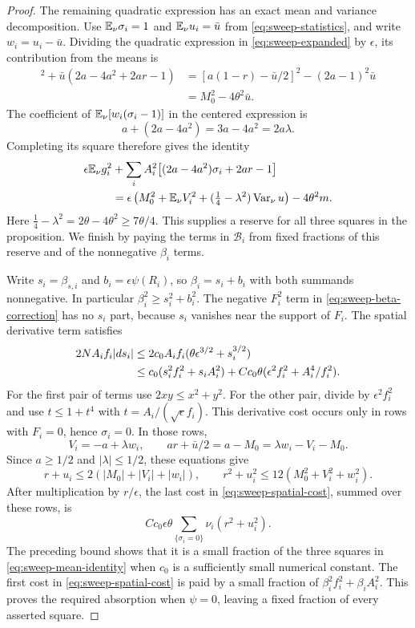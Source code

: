 \begin{proof}
The remaining quadratic expression has an exact mean and
variance decomposition.  Use \(\mathbb E_\nu\sigma_i=1\) and
\(\mathbb E_\nu u_i=\bar u\) from \eqref{eq:sweep-statistics}, and write
\(w_i=u_i-\bar u\).  Dividing the quadratic expression in
\eqref{eq:sweep-expanded} by \(\epsilon\), its contribution
from the means is
\begin{align*}
 [a(1-r)+\bar u/2]^2+\bar u(2a-4a^2+2ar-1)
 &= [a(1-r)-\bar u/2]^2-(2a-1)^2\bar u\\
 &=M_0^2-4\theta^2\bar u .
\end{align*}
The coefficient of
\(\mathbb E_\nu[w_i(\sigma_i-1)]\) in the centered expression is
\[
 a+(2a-4a^2)=3a-4a^2=2a\lambda .
\]
Completing its square therefore gives the identity
\begin{align}
 \epsilon\mathbb E_\nu g_i^2
 &+\sum_i A_i^2\bigl[(2a-4a^2)\sigma_i+2ar-1\bigr] \notag\\
 &=
 \epsilon\left(M_0^2+\mathbb E_\nu V_i^2+
                   (\tfrac14-\lambda^2)\operatorname{Var}_\nu u\right)
        -4\theta^2m .
 \label{eq:sweep-mean-identity}
\end{align}
Here
\(\tfrac14-\lambda^2=2\theta-4\theta^2\ge7\theta/4\).
This supplies a reserve for all three squares in the
proposition.  We finish by paying the terms in
\(\mathcal B_i\) from fixed fractions of this reserve and of
the nonnegative \(\beta_i\) terms.

Write \(s_i=\beta_{s,i}\) and \(b_i=\epsilon\psi(R_i)\), so
\(\beta_i=s_i+b_i\) with both summands nonnegative.
In particular \(\beta_i^2\ge s_i^2+b_i^2\).
The negative \(F_i^2\) term in
\eqref{eq:sweep-beta-correction} has no \(s_i\) part, because
\(s_i\) vanishes near the support of \(F_i\).
The spatial derivative term satisfies
\begin{align}
 2NA_if_i|ds_i|
 &\le2c_0 A_if_i(\theta\epsilon^{3/2}+s_i^{3/2}) \notag\\
 &\le c_0(s_i^2f_i^2+s_iA_i^2)
       +Cc_0\theta(\epsilon^2f_i^2+A_i^4/f_i^2).
 \label{eq:sweep-spatial-cost}
\end{align}
For the first pair of terms use \(2xy\le x^2+y^2\).
For the other pair, divide by \(\epsilon^2f_i^2\) and use
\(t\le1+t^4\) with \(t=A_i/(\sqrt\epsilon f_i)\).
This derivative cost occurs only in rows with \(F_i=0\), hence
\(\sigma_i=0\).  In those rows,
\[
 V_i=-a+\lambda w_i,\qquad
 ar+\bar u/2=a-M_0=\lambda w_i-V_i-M_0 .
\]
Since \(a\ge1/2\) and \(|\lambda|\le1/2\), these equations give
\[
 r+u_i\le2(|M_0|+|V_i|+|w_i|),\qquad
 r^2+u_i^2\le12(M_0^2+V_i^2+w_i^2).
\]
After multiplication by \(r/\epsilon\), the last cost in
\eqref{eq:sweep-spatial-cost}, summed over these rows, is
\[
 Cc_0\epsilon\theta
     \sum_{\{\sigma_i=0\}}\nu_i(r^2+u_i^2).
\]
The preceding bound shows that it is a small fraction of the
three squares in \eqref{eq:sweep-mean-identity} when \(c_0\)
is a sufficiently small numerical constant.  The first cost
in \eqref{eq:sweep-spatial-cost} is paid by a small fraction
of \(\beta_i^2f_i^2+\beta_iA_i^2\).
This proves the required absorption when \(\psi=0\), leaving
a fixed fraction of every asserted square.


\end{proof}
